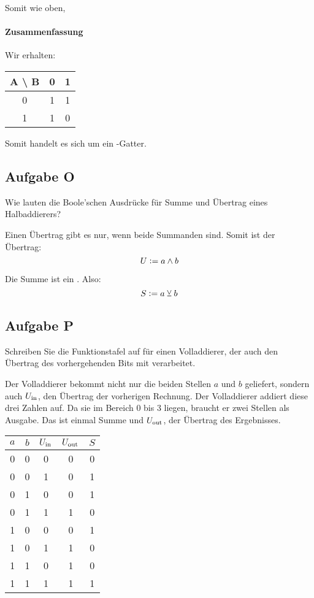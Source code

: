 Somit wie oben, \thigh

\paragraph{Zusammenfassung}

Wir erhalten:

\begin{tabular}{c|cc}
	A \textbackslash{} B & 0 & 1 \\
	\hline
	0 & 1 & 1 \\
	1 & 1 & 0
\end{tabular}

Somit handelt es sich um ein \tnand-Gatter.

\FloatBarrier
\subsection{Aufgabe O}

\begin{problem}
	Wie lauten die Boole'schen Ausdrücke für Summe und Übertrag eines
	Halbaddierers?
\end{problem}

Einen Übertrag gibt es nur, wenn beide Summanden \thigh{} sind. Somit ist der
Übertrag:
\[
	U := a \wedge b
\]

Die Summe ist ein \txor. Also:
\[
	S := a \veebar b
\]

\FloatBarrier
\subsection{Aufgabe P}

\begin{problem}
	Schreiben Sie die Funktionstafel auf für einen Volladdierer, der auch den
	Übertrag des vorhergehenden Bits mit verarbeitet.
\end{problem}

Der Volladdierer bekommt nicht nur die beiden Stellen $a$ und $b$ geliefert,
sondern auch $U_\text{in}$, den Übertrag der vorherigen Rechnung. Der Volladdierer
addiert diese drei Zahlen auf. Da sie im Bereich 0 bis 3 liegen, braucht er
zwei Stellen als Ausgabe. Das ist einmal Summe und $U_\text{out}$, der Übertrag des
Ergebnisses.

\begin{tabular}{ccc|cc}
	$a$ & $b$ & $U_\text{in}$ & $U_\text{out}$ & $S$ \\
	\hline
	0 & 0 & 0 & 0 & 0 \\
	0 & 0 & 1 & 0 & 1 \\
	0 & 1 & 0 & 0 & 1 \\
	0 & 1 & 1 & 1 & 0 \\
	1 & 0 & 0 & 0 & 1 \\
	1 & 0 & 1 & 1 & 0 \\
	1 & 1 & 0 & 1 & 0 \\
	1 & 1 & 1 & 1 & 1 \\
\end{tabular}

